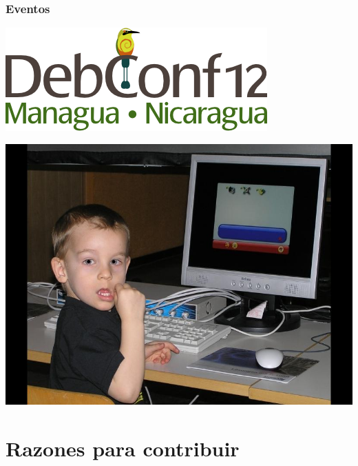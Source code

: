 \documentclass{beamer}
\begin{document}
\begin{frame}
\frametitle{Eventos}
        \begin{center}
                 \includegraphics[scale=0.50]{../img/debconf_12_nicaragua.png}
        \end{center}
\end{frame}

\begin{frame}
	\begin{center}
		\includegraphics[scale=0.30]{../img/ninoedu.jpg}
	\end{center}
\end{frame}

\section{Razones para contribuir}
\end{document}
